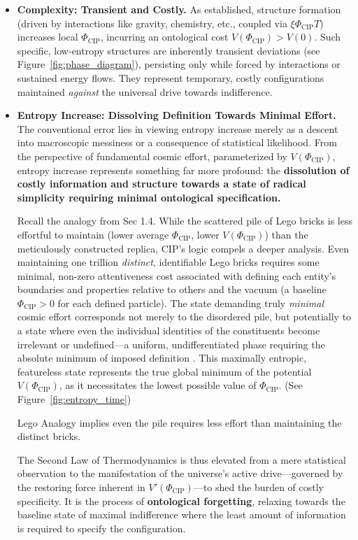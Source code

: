 \documentclass[11pt, a4paper]{article}
\newcommand{\subt}[1]{\mathrm{#1}}
\begin{document}
\begin{itemize}
    \item \textbf{Complexity: Transient and Costly.} As established, structure formation (driven by interactions like gravity, chemistry, etc., coupled via $\xi\Phi_{\subt{CIP}}T$) increases local $\Phi_{\subt{CIP}}$, incurring an ontological cost $V(\Phi_{\subt{CIP}}) > V(0)$. Such specific, low-entropy structures are inherently transient deviations (see Figure~\ref{fig:phase_diagram}), persisting only while forced by interactions or sustained energy flows. They represent temporary, costly configurations maintained \textit{against} the universal drive towards indifference.

    \item \textbf{Entropy Increase: Dissolving Definition Towards Minimal Effort.} The conventional error lies in viewing entropy increase merely as a descent into macroscopic messiness or a consequence of statistical likelihood. From the perspective of fundamental cosmic effort, parameterized by $V(\Phi_{\subt{CIP}})$, entropy increase represents something far more profound: the \textbf{dissolution of costly information and structure towards a state of radical simplicity requiring minimal ontological specification.}

    Recall the analogy from Sec 1.4. While the scattered pile of Lego bricks is less effortful to maintain (lower average $\Phi_{\subt{CIP}}$, lower $V(\Phi_{\subt{CIP}})$) than the meticulously constructed replica, CIP's logic compels a deeper analysis. Even maintaining one trillion \textit{distinct}, identifiable Lego bricks requires some minimal, non-zero attentiveness cost associated with defining each entity's boundaries and properties relative to others and the vacuum (a baseline $\Phi_{\subt{CIP}} > 0$ for each defined particle). The state demanding truly \textit{minimal} cosmic effort corresponds not merely to the disordered pile, but potentially to a state where even the individual identities of the constituents become irrelevant or undefined—a uniform, undifferentiated phase requiring the absolute minimum of imposed definition \cite{Boltzmann1877}. This maximally entropic, featureless state represents the true global minimum of the potential $V(\Phi_{\subt{CIP}})$, as it necessitates the lowest possible value of $\Phi_{\subt{CIP}}$. (See Figure~\ref{fig:entropy_time})

    Lego Analogy implies even the pile requires less effort than maintaining the distinct bricks.

    The Second Law of Thermodynamics is thus elevated from a mere statistical observation to the manifestation of the universe's active drive—governed by the restoring force inherent in $V'(\Phi_{\subt{CIP}})$—to shed the burden of costly specificity. It is the process of \textbf{ontological forgetting}, relaxing towards the baseline state of maximal indifference where the least amount of information is required to specify the configuration.


\end{itemize}
\end{document}
